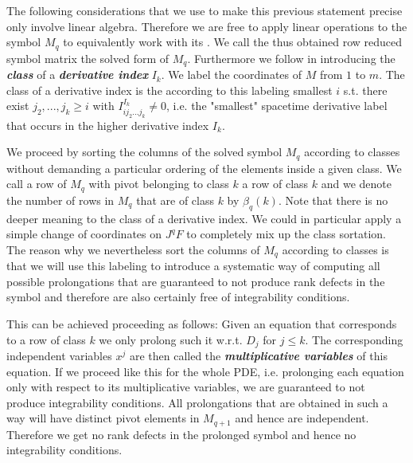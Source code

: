 \documentclass[a4paper,12pt, DIV=14, BCOR=5mm, twoside, headsepline, numbers=noenddot]{scrbook}
\begin{document}
The following considerations that we use to make this previous statement precise only involve linear algebra. Therefore we are free to apply linear operations to the symbol $M_q$ to equivalently work with its . We call the thus obtained row reduced symbol matrix the solved form of $M_q$. Furthermore we follow \cite{seiler1994analysis} in introducing the \textit{\textbf{class}} of a \textit{\textbf{derivative index}} $I_k$. We label the coordinates of $M$ from $1$ to $m$. The class of a derivative index is the according to this labeling smallest $i$ s.t. there exist $j_2,...,j_k\geq i$ with $I^{I_k}_{ij_2...j_k} \neq 0$, i.e. the "smallest" spacetime derivative label that occurs in the higher derivative index $I_k$.

We proceed by sorting the columns of the solved symbol $M_q$ according to classes without demanding a particular ordering of the elements inside a given class. We call a row of $M_q$ with pivot belonging to class $k$ a row of class $k$ and we denote the number of rows in $M_q$ that are of class $k$ by $\beta_q(k)$. Note that there is no deeper meaning to the class of a derivative index. We could in particular apply a simple change of coordinates on $J^qF$ to completely mix up the class sortation. The reason why we nevertheless sort the columns of $M_q$ according to classes is that we will use this labeling to introduce a systematic way of computing all possible prolongations that are guaranteed to not produce rank defects in the symbol and therefore are also certainly free of integrability conditions.

This can be achieved proceeding as follows:
Given an equation that corresponds to a row of class $k$ we only prolong such it w.r.t. $D_j$ for  $j \leq k$. The corresponding independent variables $x^j$ are then called the \textbf{\textit{multiplicative variables}} of this equation. If we proceed like this for the whole PDE, i.e. prolonging each equation only with respect to its multiplicative variables, we are guaranteed to not produce integrability conditions. All prolongations that are obtained in such a way will have distinct pivot elements in $M_{q+1}$ and hence are independent. Therefore we get no rank defects in the prolonged symbol and hence no integrability conditions.\\ 
\end{document}

